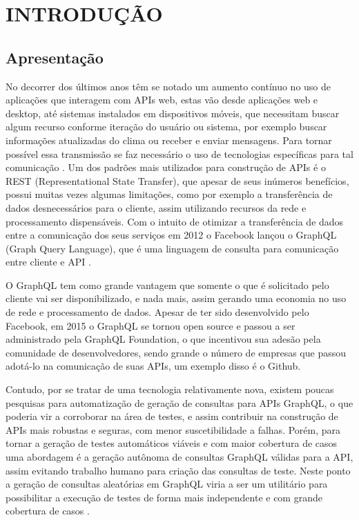 \chapter{INTRODUÇÃO}
\label{chap:introducao}
\section{Apresentação}

No decorrer dos últimos anos têm se notado um aumento contínuo no uso de aplicações que interagem com APIs web, estas vão desde aplicações web e desktop, até sistemas instalados em dispositivos móveis, que necessitam buscar algum recurso conforme iteração do usuário ou sistema, por exemplo buscar informações atualizadas do clima ou receber e enviar mensagens. Para tornar possível essa transmissão se faz necessário o uso de tecnologias específicas para tal comunicação \cite{jin2018}. Um dos padrões mais utilizados para construção de APIs é o REST (Representational State Transfer), que apesar de seus inúmeros benefícios, possui muitas vezes algumas limitações, como por exemplo a transferência de dados desnecessários para o cliente, assim utilizando recursos da rede e processamento dispensáveis. Com o intuito de otimizar a transferência de dados entre a comunicação dos seus serviços em 2012 o Facebook lançou o GraphQL (Graph Query Language), que é uma linguagem de consulta para comunicação entre cliente e API \cite{graphql}.

O GraphQL tem como grande vantagem que somente o que é solicitado pelo cliente vai ser disponibilizado, e nada mais, assim gerando uma economia no uso de rede e processamento de dados. Apesar de ter sido desenvolvido pelo Facebook, em 2015 o GraphQL se tornou open source e passou a ser administrado pela GraphQL Foundation, o que incentivou sua adesão pela comunidade de desenvolvedores, sendo grande o número de empresas que passou adotá-lo na comunicação de suas APIs, um exemplo disso é o Github\cite{graphql}.

Contudo, por se tratar de uma tecnologia relativamente nova, existem poucas pesquisas para automatização de geração de consultas para APIs GraphQL, o que poderia vir a corroborar na área de testes, e assim contribuir na construção de APIs mais robustas e seguras, com menor suscetibilidade a falhas. Porém, para tornar a geração de testes automáticos viáveis e com maior cobertura de casos uma abordagem é a geração autônoma de consultas GraphQL válidas para a API, assim evitando trabalho humano para criação das consultas de teste. Neste ponto a geração de consultas aleatórias em GraphQL viria a ser um utilitário para possibilitar a execução de testes de forma mais independente e com grande cobertura de casos \cite{pagrut2018}.

